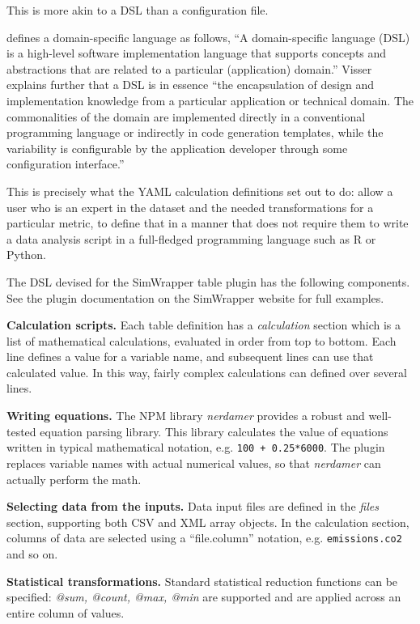 This is more akin to a \gls{DSL} than a configuration file.

\cite{Visser2008} defines a domain-specific language as follows, ``A domain-specific language (DSL) is a high-level software implementation language that supports concepts and abstractions that are related to a particular (application) domain.'' Visser explains further that a DSL is in essence ``the encapsulation of design and implementation knowledge from a particular application or technical domain. The commonalities of the domain are implemented directly in a conventional programming language or indirectly in code generation templates, while the variability is configurable by the application developer through some configuration interface.''

This is precisely what the YAML calculation definitions set out to do: allow a user who is an expert in the dataset and the needed transformations for a particular metric, to define that in a manner that does not require them to write a data analysis script in a full-fledged programming language such as R or Python.

The DSL devised for the SimWrapper table plugin has the following components. See the plugin documentation on the SimWrapper website for full examples.

\textbf{Calculation scripts.} Each table definition has a \emph{calculation} section which is a list of mathematical calculations, evaluated in order from top to bottom. Each line defines a value for a variable name, and subsequent lines can use that calculated value. In this way, fairly complex calculations can defined over several lines.

\textbf{Writing equations.} The NPM library \emph{nerdamer} provides a robust and well-tested equation parsing library. This library calculates the value of equations written in typical mathematical notation, e.g. \texttt{100 + 0.25*6000}. The plugin replaces variable names with actual numerical values, so that \emph{nerdamer} can actually perform the math.

\textbf{Selecting data from the inputs.} Data input files are defined in the \emph{files} section, supporting both CSV and XML array objects. In the calculation section, columns of data are selected using a ``file.column'' notation, e.g. \texttt{emissions.co2} and so on.

\textbf{Statistical transformations.} Standard statistical reduction functions can be specified: \emph{@sum, @count, @max, @min} are supported and are applied across an entire column of values.

